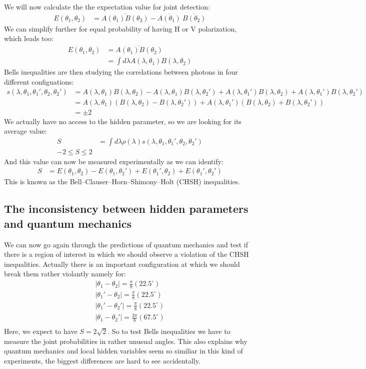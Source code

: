 \documentclass[10pt]{article}
\begin{document}
We will now calculate the the expectation value for joint detection:
\begin{align}
E(\theta_1, \theta_2)&=\overline{A(\theta_1)B(\theta_2)}-\overline{A(\theta_1)}~\overline{B(\theta_2)}
\end{align}
We can simplify further for equal probability of having H or V polarization, which leads too:
\begin{align}
E(\theta_1, \theta_2)&=\overline{A(\theta_1)B(\theta_2)}\\
 &=\int d\lambda  A(\lambda, \theta_1)B(\lambda, \theta_2)
\end{align}
Bells inequalities are then studying the correlations between photons in four different configuations:
\begin{align}
s(\lambda, \theta_1, \theta_1', \theta_2, \theta_2')&= A(\lambda, \theta_1)B(\lambda, \theta_2)-A(\lambda, \theta_1)B(\lambda, \theta_2') +A(\lambda, \theta_1')B(\lambda, \theta_2)+A(\lambda, \theta_1')B(\lambda, \theta_2')\\
&= A(\lambda, \theta_1)(B(\lambda, \theta_2)-B(\lambda, \theta_2'))+A(\lambda, \theta_1')(B(\lambda, \theta_2)+B(\lambda, \theta_2'))\\
&= \pm 2
\end{align}
We actually have no access to the hidden parameter, so we are looking for its average value:
\begin{align}
S &= \int d\lambda \rho(\lambda) s(\lambda, \theta_1, \theta_1', \theta_2, \theta_2')\\
-2\leq S\leq 2
\end{align}
And this value can now be measured experimentally as we can identify:
\begin{align}
S &= E(\theta_1, \theta_2)-E(\theta_1, \theta_2')+E(\theta_1', \theta_2)+E(\theta_1', \theta_2')
\end{align}
This is known as the Bell--Clauser--Horn--Shimony--Holt (CHSH) inequalities.

\subsection{The inconsistency between hidden parameters and quantum mechanics}

We can now go again through the predictions of quantum mechanics and test if there is a region of interest in which we should observe a violation of the CHSH inequalities. Actually there is an important configuration at which we should break them rather violantly namely for:
\begin{align}
|\theta_1-\theta_2| =\frac{\pi}{8}(22.5^\circ)\\
|\theta_1'-\theta_2| =\frac{\pi}{8}(22.5^\circ)\\
|\theta_1'-\theta_2'| =\frac{\pi}{8}(22.5^\circ)\\
|\theta_1-\theta_2'| =\frac{3\pi}{8}(67.5^\circ)\\
\end{align}
Here, we expect to have $S= 2\sqrt{2}$. So to test Bells inequalities we have to measure the joint probabilities in rather unusual angles. This also explains why quantum mechanics and local hidden variables seem so similiar in this kind of experiments, the biggest differences are hard to see accidentally.
\end{document}
